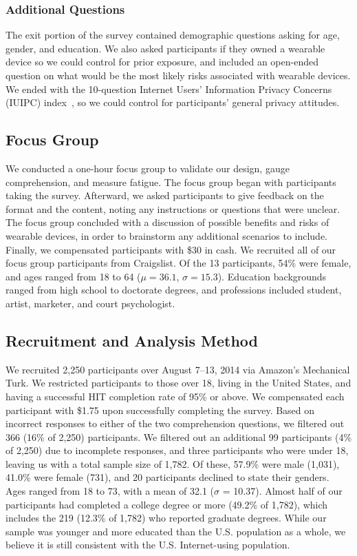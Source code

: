 \subsubsection{Additional Questions}
The exit portion of the survey contained demographic questions asking for age, gender, and education. We also asked participants if they owned a wearable device so we could control for prior exposure, and included an open-ended question on what would be the most likely risks associated with wearable devices. We ended with the 10-question Internet Users' Information Privacy Concerns (IUIPC) index~\cite{malhotra2004internet}, so we could control for participants' general privacy attitudes.

\subsection{Focus Group}
We conducted a one-hour focus group to validate our design, gauge comprehension, and measure fatigue. The focus group began with participants taking the survey. Afterward, we asked participants to give feedback on the format and the content, noting any instructions or questions that were unclear. The focus group concluded with a discussion of possible benefits and risks of wearable devices, in order to brainstorm any additional scenarios to include. Finally, we compensated participants with \$30 in cash. We recruited all of our focus group participants from Craigslist. Of the 13 participants, 54\% were female, and ages ranged from 18 to 64 ($\mu = 36.1$, $\sigma = 15.3$).  Education backgrounds ranged from high school to doctorate degrees, and professions included student, artist, marketer, and court psychologist.

\subsection{Recruitment and Analysis Method}
We recruited 2,250 participants over August 7--13, 2014 via Amazon's Mechanical Turk. We restricted participants to those over 18, living in the United States, and having a successful HIT completion rate of 95\% or above. We compensated each participant with \$1.75 upon successfully completing the survey. Based on incorrect responses to either of the two comprehension questions, we filtered out 366 (16\% of 2,250) participants. We filtered out an additional 99 participants (4\% of 2,250) due to incomplete responses, and three participants who were under 18, leaving us with a total sample size of 1,782. Of these, 57.9\% were male (1,031), 41.0\% were female (731), and 20 participants declined to state their genders. Ages ranged from 18 to 73, with a mean of 32.1 ($\sigma$ = 10.37). Almost half of our participants had completed a college degree or more (49.2\% of 1,782), which includes the 219 (12.3\% of 1,782) who reported graduate degrees. While our sample was younger and more educated than the U.S. population as a whole, we believe it is still consistent with the U.S. Internet-using population.

